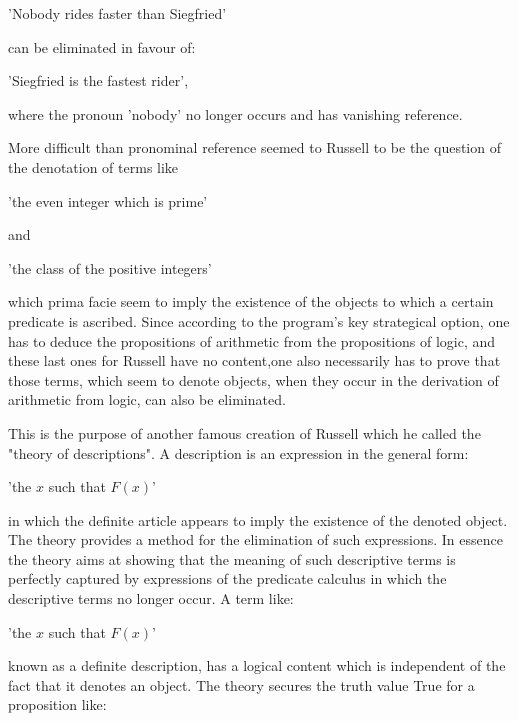 \documentclass[12pt]{article}
\begin{document}
\begin{center}
'Nobody rides faster than Siegfried'
\end{center}
 
can be eliminated in favour of:

\begin{center}
'Siegfried is the fastest rider',
\end{center}

where the pronoun 'nobody' no longer occurs and has  vanishing reference.

More difficult than pronominal reference seemed to Russell to be the question of the denotation of terms like 

\begin{center}
'the even integer which is prime'
\end{center}

and

\begin{center}
'the class of the positive integers'
\end{center}
 
which prima facie seem to imply the existence of the objects to which a certain predicate is ascribed.
Since according to the program's key strategical option, one has to deduce the propositions of arithmetic from the propositions of logic, and these last ones for Russell have no content,one also necessarily  has to prove that those terms, which seem to denote objects, when they occur in the derivation of arithmetic from logic, can also be eliminated.

This is the purpose of another famous creation of Russell which he called the "theory of descriptions". A description is an expression in the general form:

\begin{center} 
'the $x$ such that $F (x)$'
\end{center}

in which the definite article appears to imply the existence of the denoted object. The theory provides a method for the elimination of such expressions. In essence the theory aims at showing that the meaning of such descriptive terms is perfectly captured by expressions of the predicate calculus in which the descriptive terms no longer occur. A term like:

\begin{center}
'the $x$ such that $F (x)$'
\end{center}

known as a definite description, has a logical content which is independent of the fact that it denotes an object. The theory secures the truth value True for a proposition like:
\end{document}
